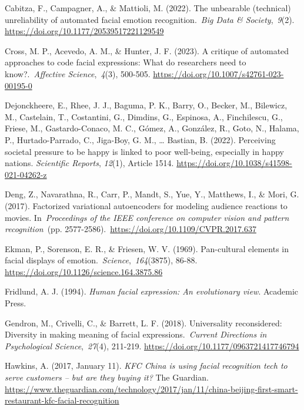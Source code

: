 \documentclass[authordate, reflection]{jote-new-article}
\begin{document}
	Cabitza, F., Campagner, A., \& Mattioli, M. (2022). The unbearable (technical) unreliability of automated facial emotion recognition. \emph{Big Data \& Society}, \emph{9}(2). \url{https://doi.org/10.1177/20539517221129549}



	Cross, M. P., Acevedo, A. M., \& Hunter, J. F. (2023). A critique of automated approaches to code facial expressions: What do researchers need to know?. \emph{Affective Science}, \emph{4}(3), 500-505. \url{https://doi.org/10.1007/s42761-023-00195-0}



	Dejonckheere, E., Rhee, J. J., Baguma, P. K., Barry, O., Becker, M., Bilewicz, M., Castelain, T., Costantini, G., Dimdins, G., Espinosa, A., Finchilescu, G., Friese, M., Gastardo-Conaco, M. C., Gómez, A., González, R., Goto, N., Halama, P., Hurtado-Parrado, C., Jiga-Boy, G. M., … Bastian, B. (2022). Perceiving societal pressure to be happy is linked to poor well-being, especially in happy nations. \emph{Scientific Reports}, \emph{12}(1), Article 1514. \url{https://doi.org/10.1038/s41598-021-04262-z}



	Deng, Z., Navarathna, R., Carr, P., Mandt, S., Yue, Y., Matthews, I., \& Mori, G. (2017). Factorized variational autoencoders for modeling audience reactions to movies. In \emph{Proceedings of the IEEE conference on computer vision and pattern recognition} (pp. 2577-2586). \url{https://doi.org/10.1109/CVPR.2017.637}



	Ekman, P., Sorenson, E. R., \& Friesen, W. V. (1969). Pan-cultural elements in facial displays of emotion. \emph{Science}, \emph{164}(3875), 86-88. \url{https://doi.org/10.1126/science.164.3875.86}



	Fridlund, A. J. (1994). \emph{Human facial expression: An evolutionary view}. Academic Press.



	Gendron, M., Crivelli, C., \& Barrett, L. F. (2018). Universality reconsidered: Diversity in making meaning of facial expressions. \emph{Current Directions in Psychological Science}, \emph{27}(4), 211-219. \url{https://doi.org/10.1177/0963721417746794}



	Hawkins, A. (2017, January 11). \emph{KFC China is using facial recognition tech to serve } \emph{customers -- but are they buying it?} The Guardian. \url{https://www.theguardian.com/technology/2017/jan/11/china-beijing-first-smart-restaurant-kfc-facial-recognition}
\end{document}
